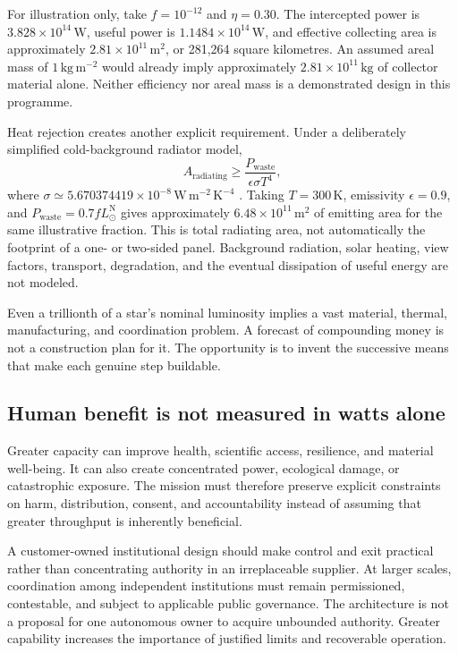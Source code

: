 For illustration only, take $f=10^{-12}$ and $\eta=0.30$. The intercepted power is $3.828\times10^{14}\,\mathrm W$, useful power is $1.1484\times10^{14}\,\mathrm W$, and effective collecting area is approximately $2.81\times10^{11}\,\mathrm{m^2}$, or 281,264 square kilometres. An assumed areal mass of $1\,\mathrm{kg\,m^{-2}}$ would already imply approximately $2.81\times10^{11}\,\mathrm{kg}$ of collector material alone. Neither efficiency nor areal mass is a demonstrated design in this programme.

Heat rejection creates another explicit requirement. Under a deliberately simplified cold-background radiator model,
\begin{equation}
 A_{\mathrm{radiating}}\geq\frac{P_{\mathrm{waste}}}{\epsilon\sigma T^4},
 \label{eq:heat}
\end{equation}
where $\sigma\simeq5.670374419\times10^{-8}\,\mathrm{W\,m^{-2}\,K^{-4}}$ \citep{nistSigma}. Taking $T=300\,\mathrm K$, emissivity $\epsilon=0.9$, and $P_{\mathrm{waste}}=0.7fL_\odot^{\mathrm N}$ gives approximately $6.48\times10^{11}\,\mathrm{m^2}$ of emitting area for the same illustrative fraction. This is total radiating area, not automatically the footprint of a one- or two-sided panel. Background radiation, solar heating, view factors, transport, degradation, and the eventual dissipation of useful energy are not modeled.

\begin{insight}
Even a trillionth of a star's nominal luminosity implies a vast material, thermal, manufacturing, and coordination problem. A forecast of compounding money is not a construction plan for it. The opportunity is to invent the successive means that make each genuine step buildable.
\end{insight}

\subsection{Human benefit is not measured in watts alone}
Greater capacity can improve health, scientific access, resilience, and material well-being. It can also create concentrated power, ecological damage, or catastrophic exposure. The mission must therefore preserve explicit constraints on harm, distribution, consent, and accountability instead of assuming that greater throughput is inherently beneficial.

A customer-owned institutional design should make control and exit practical rather than concentrating authority in an irreplaceable supplier. At larger scales, coordination among independent institutions must remain permissioned, contestable, and subject to applicable public governance. The architecture is not a proposal for one autonomous owner to acquire unbounded authority. Greater capability increases the importance of justified limits and recoverable operation.

